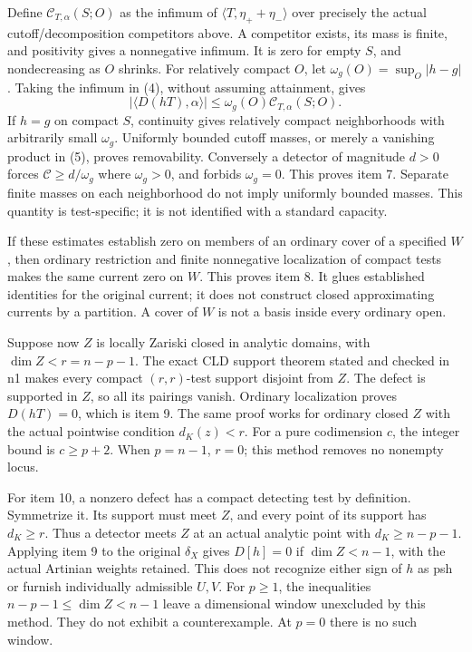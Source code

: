 \documentclass[11pt]{article}
\begin{document}
Define \(\mathcal C_{T,\alpha}(S;O)\) as the infimum of \(\langle T,\eta_++\eta_-\rangle\) over precisely the actual cutoff/decomposition competitors above. A competitor exists, its mass is finite, and positivity gives a nonnegative infimum. It is zero for empty \(S\), and nondecreasing as \(O\) shrinks. For relatively compact \(O\), let \(\omega_g(O)=\sup_O|h-g|\). Taking the infimum in (4), without assuming attainment, gives
\[
 |\langle D(hT),\alpha\rangle|\leq
 \omega_g(O)\mathcal C_{T,\alpha}(S;O).                                    \tag{5}
\]
If \(h=g\) on compact \(S\), continuity gives relatively compact neighborhoods with arbitrarily small \(\omega_g\). Uniformly bounded cutoff masses, or merely a vanishing product in (5), proves removability. Conversely a detector of magnitude \(d>0\) forces \(\mathcal C\geq d/\omega_g\) where \(\omega_g>0\), and forbids \(\omega_g=0\). This proves item 7. Separate finite masses on each neighborhood do not imply uniformly bounded masses. This quantity is test-specific; it is not identified with a standard capacity.

If these estimates establish zero on members of an ordinary cover of a specified \(W\), then ordinary restriction and finite nonnegative localization of compact tests makes the same current zero on \(W\). This proves item 8. It glues established identities for the original current; it does not construct closed approximating currents by a partition. A cover of \(W\) is not a basis inside every ordinary open.

Suppose now \(Z\) is locally Zariski closed in analytic domains, with \(\dim Z<r=n-p-1\). The exact CLD support theorem stated and checked in n1 makes every compact \((r,r)\)-test support disjoint from \(Z\). The defect is supported in \(Z\), so all its pairings vanish. Ordinary localization proves \(D(hT)=0\), which is item 9. The same proof works for ordinary closed \(Z\) with the actual pointwise condition \(d_K(z)<r\). For a pure codimension \(c\), the integer bound is \(c\geq p+2\). When \(p=n-1\), \(r=0\); this method removes no nonempty locus.

For item 10, a nonzero defect has a compact detecting test by definition. Symmetrize it. Its support must meet \(Z\), and every point of its support has \(d_K\geq r\). Thus a detector meets \(Z\) at an actual analytic point with \(d_K\geq n-p-1\). Applying item 9 to the original \(\delta_X\) gives \(D[h]=0\) if \(\dim Z<n-1\), with the actual Artinian weights retained. This does not recognize either sign of \(h\) as psh or furnish individually admissible \(U,V\). For \(p\geq1\), the inequalities \(n-p-1\leq\dim Z<n-1\) leave a dimensional window unexcluded by this method. They do not exhibit a counterexample. At \(p=0\) there is no such window.
\end{document}
